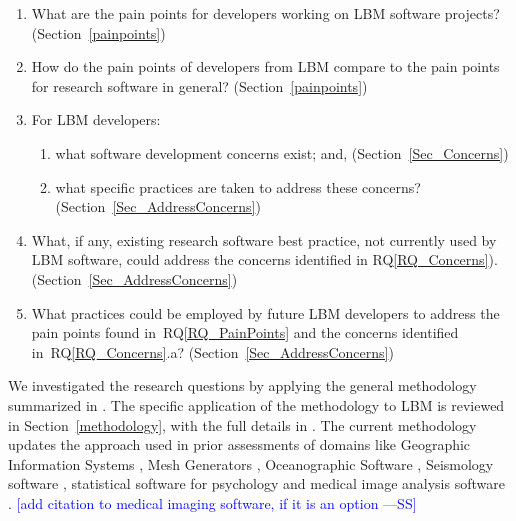 \documentclass[final, 3p, times, authoryear]{elsarticle}
\newcommand{\authornote}[3]{\textcolor{#1}{[#3 ---#2]}}
\newcommand{\authornote}[3]{}
\newcommand{\wss}[1]{\authornote{blue}{SS}{#1}} %
\newcounter{rqnum} %
\newcommand{\rqref}[1]{RQ\ref{#1}}
\begin{document}
\begin{enumerate}
	\item [RQ\refstepcounter{rqnum}\therqnum \label{RQ_PainPoints}:] What are
	the pain points for developers working on LBM software projects?
	(Section~\ref{painpoints})
	\item [RQ\refstepcounter{rqnum}\therqnum \label{RQ_ComparePainPoints}:] How
	do the pain points of developers from LBM compare to the pain points
	for research software in general? (Section~\ref{painpoints})
	\item [RQ\refstepcounter{rqnum}\therqnum \label{RQ_Concerns}:] For LBM
	developers:
	\begin{enumerate} 
		\item [\rqref{RQ_Concerns}.a] what software development concerns exist; and, (Section~\ref{Sec_Concerns})
		\item [\rqref{RQ_Concerns}.b] what specific practices are taken to
		address these concerns? (Section~\ref{Sec_AddressConcerns})
	\end{enumerate}
	\item [RQ\refstepcounter{rqnum}\therqnum \label{RQ_Recommend}:]
	What, if any, existing research software best practice, not currently used
	by LBM software, could address the concerns identified in
	\rqref{RQ_Concerns}). (Section~\ref{Sec_AddressConcerns})
	\item [RQ\refstepcounter{rqnum}\therqnum \label{RQ_Future}:] What practices
	could be employed by future LBM developers to address the pain points found
	in~\rqref{RQ_PainPoints} and the concerns identified
	in~\rqref{RQ_Concerns}.a? (Section~\ref{Sec_AddressConcerns})

\end{enumerate}

We investigated the research questions by applying the general methodology
summarized in \citet{SmithEtAl2021}.  The specific application of the
methodology to LBM is reviewed in Section~\ref{methodology}, with the full
details in \citep{Michalski2021}.  The current methodology updates the approach
used in prior assessments of domains like Geographic Information Systems
\citep{SmithEtAl2018_arXivGIS}, Mesh Generators \citep{SmithEtAl2016},
Oceanographic Software \citep{smith2015state}, Seismology software
\citep{SmithEtAl2018}, statistical software for psychology
\citep{SmithEtAl2018_StatSoft} and medical image analysis software
\citep{Dong2021}.  \wss{add citation to medical imaging software, if it is an
option}
\end{document}

